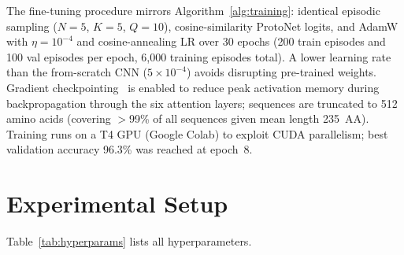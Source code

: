 \documentclass[11pt,a4paper]{article}
\begin{document}
The fine-tuning procedure mirrors Algorithm~\ref{alg:training}: identical
episodic sampling ($N=5$, $K=5$, $Q=10$), cosine-similarity ProtoNet logits,
and AdamW with $\eta = 10^{-4}$ and cosine-annealing LR over 30 epochs
(200 train episodes and 100 val episodes per epoch, 6,000 training episodes
total).  A lower learning rate than the from-scratch CNN ($5 \times 10^{-4}$)
avoids disrupting pre-trained weights.  Gradient
checkpointing~\cite{chen2016training} is enabled to reduce peak activation
memory during backpropagation through the six attention layers; sequences are
truncated to 512 amino acids (covering $>$99\% of all sequences given mean
length 235~AA).  Training runs on a T4 GPU (Google Colab) to exploit CUDA
parallelism; best validation accuracy 96.3\% was reached at epoch~8.

\section{Experimental Setup}
\label{sec:setup}

Table~\ref{tab:hyperparams} lists all hyperparameters.
\end{document}
